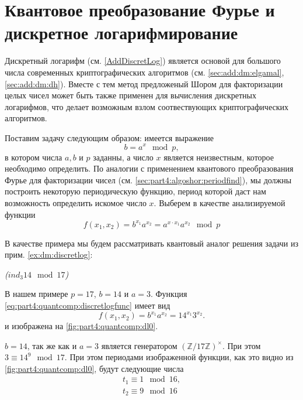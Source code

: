 \section{Квантовое преобразование Фурье и дискретное логарифмирование}
Дискретный логарифм (см. \autoref{AddDiscretLog}) является основой для
большого числа современных криптографических алгоритмов (см.
\autoref{sec:add:dm:elgamal}, \autoref{sec:add:dm:dh}). Вместе с тем 
метод предложеный Шором для факторизации целых чисел может быть также
применен для вычисления дискретных логарифмов, что делает возможным
взлом соотвествующих криптографических алгоритмов.

Поставим задачу следующим образом: имеется выражение 
\[
b = a^x \mod p,
\]
в котором числа $a, b$ и $p$ заданны, а число $x$ является
неизвестным, которое необходимо определить. По аналогии с применением
квантового преобразования Фурье для факторизации чисел (см.
\autoref{sec:part4:algoshor:periodfind}), мы должны
построить некоторую периодическую функцию, период которой даст нам
возможность определить искомое число $x$. Выберем в качестве анализируемой функции
\begin{equation}
f\left(x_1, x_2\right) = b^{x_1}a^{x_2} = a^{x \cdot x_1} a^{x_2} \mod p
\label{eq:part4:quantcomp:discretlogfunc}
\end{equation}

В качестве примера мы будем рассматривать квантовый аналог решения задачи из прим.
\ref{ex:dm:discretlog}:
\begin{example}
\emph{($ind_3{14} \mod{17}$)}
%

В нашем примере $p = 17$, $b=14$ и $a=3$. Функция
\eqref{eq:part4:quantcomp:discretlogfunc} имеет вид
\[
f\left(x_1, x_2\right) = b^{x_1}a^{x_2} = 14^{x_1}3^{x_2}.
\]
и изображена на \autoref{fig:part4:quantcomp:dl0}.

$b=14$, так же как и $a=3$ является генератором
$\left(\mathbb{Z}/17\mathbb{Z}\right)^\times$. При этом $3 \equiv 14^9
\mod 17$. При этом периодами изображенной функции, как это видно из
\autoref{fig:part4:quantcomp:dl0}, будут следующие числа 
\begin{eqnarray}
t_1 \equiv 1 \mod 16,
\nonumber \\
t_2 \equiv 9 \mod 16
\end{eqnarray} 
\label{ex:part4:quantcomp:discretlog:periodfinding0}
\end{example}


